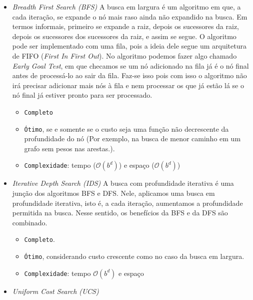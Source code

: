 \documentclass{article}
\begin{document}
\begin{itemize}
	\item \textit{Breadth First Search (BFS)}
	      A busca em largura é um algoritmo em que, a cada iteração,
	      se expande o nó mais raso ainda não expandido na busca. Em termos informais,
	      primeiro se expande a raiz, depois os sucessores da raiz, depois os sucessores
	      dos sucessores da raiz, e assim se segue. O algoritmo pode ser implementado
	      com uma fila, pois a ideia dele segue um arquitetura de FIFO (\textit{First In First Out}).
	      No algoritmo podemos fazer algo chamado \textit{Early Goal Test}, em que checamos se um nó adicionado na fila
	      já é o nó final antes de processá-lo ao sair da fila. Faz-se isso pois com isso
	      o algoritmo não irá precisar adicionar mais nós à fila e nem processar os que já estão lá se o nó final
	      já estiver pronto para ser processado.

	      \begin{itemize}
		      \item \texttt{Completo}
		      \item \texttt{Ótimo}, se e somente se o custo seja uma função
		            não decrescente da profundidade do nó (Por exemplo, na busca de menor caminho em
		            um grafo sem pesos nas arestas.).
		      \item \texttt{Complexidade}: tempo (\(\mathcal{O}(b^d)\)) e espaço (\(\mathcal{O}(b^d)\))
	      \end{itemize}

	\item \textit{Iterative Depth Search (IDS)}
	      A busca com profundidade iterativa é uma junção dos algoritmos
	      BFS e DFS. Nele, aplicamos uma busca em profundidade iterativa, isto é, a cada iteração,
	      aumentamos a profundidade permitida na busca. Nesse sentido,
	      os benefícios da BFS e da DFS são combinado.

	      \begin{itemize}
		      \item \texttt{Completo}.
		      \item \texttt{Ótimo}, considerando custo crescente como no caso da busca em largura.
		      \item \texttt{Complexidade}: tempo \(\mathcal{O}(b^d)\) e espaço
	      \end{itemize}

	\item \textit{Uniform Cost Search (UCS)}


\end{itemize}
\end{document}
